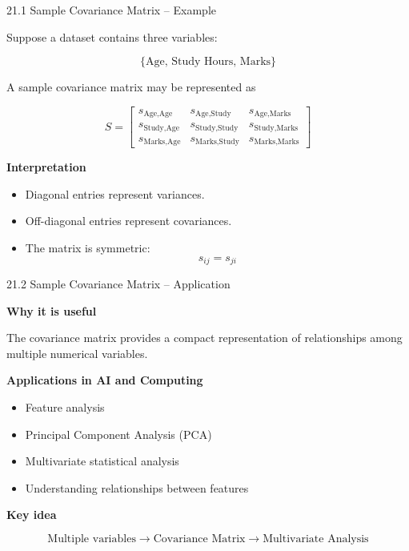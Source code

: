 
\begin{frame}{21.1 Sample Covariance Matrix -- Example}

Suppose a dataset contains three variables:

\[
\{\text{Age, Study Hours, Marks}\}
\]

A sample covariance matrix may be represented as

\[
S=
\begin{bmatrix}
s_{\text{Age,Age}} &
s_{\text{Age,Study}} &
s_{\text{Age,Marks}}
\\
s_{\text{Study,Age}} &
s_{\text{Study,Study}} &
s_{\text{Study,Marks}}
\\
s_{\text{Marks,Age}} &
s_{\text{Marks,Study}} &
s_{\text{Marks,Marks}}
\end{bmatrix}
\]

\textbf{Interpretation}

\begin{itemize}
    \item Diagonal entries represent variances.
    \item Off-diagonal entries represent covariances.
    \item The matrix is symmetric:
    \[
    s_{ij}=s_{ji}
    \]
\end{itemize}

\end{frame}



\begin{frame}{21.2 Sample Covariance Matrix -- Application}

\textbf{Why it is useful}

The covariance matrix provides a compact representation of
relationships among multiple numerical variables.

\vspace{0.4cm}

\textbf{Applications in AI and Computing}

\begin{itemize}
    \item Feature analysis
    \item Principal Component Analysis (PCA)
    \item Multivariate statistical analysis
    \item Understanding relationships between features
\end{itemize}

\vspace{0.4cm}

\textbf{Key idea}

\[
\boxed{
\text{Multiple variables}
\longrightarrow
\text{Covariance Matrix}
\longrightarrow
\text{Multivariate Analysis}
}
\]

\end{frame}